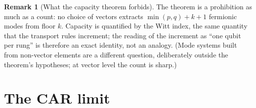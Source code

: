 \documentclass[11pt]{article}
\theoremstyle{definition}
\newtheorem{remark}[theorem]{Remark}
\theoremstyle{plain}
\begin{document}
\begin{remark}[What the capacity theorem forbids]\label{c:note.tower.what-capacity-theorem-forbids}
The theorem is a prohibition as much as a count: no choice of vectors extracts $\min(p,q) + k + 1$ fermionic modes from floor $k$. Capacity is quantified by the Witt index, the same quantity that the transport rules increment; the reading of the increment as ``one qubit per rung'' is therefore an exact identity, not an analogy. (Mode systems built from non-vector elements are a different question, deliberately outside the theorem's hypotheses; at vector level the count is sharp.)
\end{remark}

\section{The CAR limit}
\end{document}
